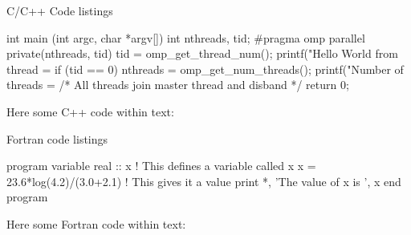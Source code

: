 \documentclass[aspectratio=43]{beamer}
\begin{document}
\begin{frame}[fragile]{C/C++ Code listings}
\begin{Cpplisting}{}
int main (int argc, char *argv[]) {
    int nthreads, tid;
    #pragma omp parallel private(nthreads, tid)
    {
        tid = omp_get_thread_num();
        printf("Hello World from thread = %
        if (tid == 0) {
            nthreads = omp_get_num_threads();
            printf("Number of threads = %
        }
    }  /* All threads join master thread and disband */
    return 0;
}
\end{Cpplisting}
Here some C++ code within text: 
\end{frame}

\begin{frame}[fragile]{Fortran code listings}
\begin{Fortranlisting}{}
program variable
real :: x ! This defines a variable called x
x = 23.6*log(4.2)/(3.0+2.1) ! This gives it a value
print *, 'The value of x is ', x 
end program
\end{Fortranlisting}
Here some Fortran code within text: 
\end{frame}

\end{document}
